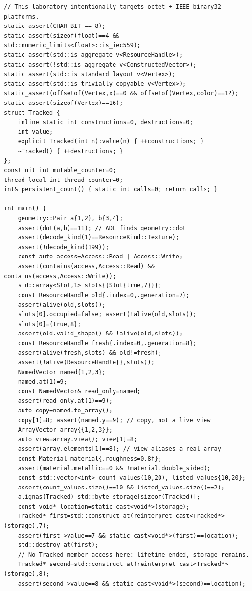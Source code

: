 \begin{verbatim}
// This laboratory intentionally targets octet + IEEE binary32 platforms.
static_assert(CHAR_BIT == 8);
static_assert(sizeof(float)==4 && std::numeric_limits<float>::is_iec559);
static_assert(std::is_aggregate_v<ResourceHandle>);
static_assert(!std::is_aggregate_v<ConstructedVector>);
static_assert(std::is_standard_layout_v<Vertex>);
static_assert(std::is_trivially_copyable_v<Vertex>);
static_assert(offsetof(Vertex,x)==0 && offsetof(Vertex,color)==12);
static_assert(sizeof(Vertex)==16);
struct Tracked {
    inline static int constructions=0, destructions=0;
    int value;
    explicit Tracked(int n):value(n) { ++constructions; }
    ~Tracked() { ++destructions; }
};
constinit int mutable_counter=0;
thread_local int thread_counter=0;
int& persistent_count() { static int calls=0; return calls; }

int main() {
    geometry::Pair a{1,2}, b{3,4};
    assert(dot(a,b)==11); // ADL finds geometry::dot
    assert(decode_kind(1)==ResourceKind::Texture);
    assert(!decode_kind(199));
    const auto access=Access::Read | Access::Write;
    assert(contains(access,Access::Read) && contains(access,Access::Write));
    std::array<Slot,1> slots{{Slot{true,7}}};
    const ResourceHandle old{.index=0,.generation=7};
    assert(alive(old,slots));
    slots[0].occupied=false; assert(!alive(old,slots));
    slots[0]={true,8};
    assert(old.valid_shape() && !alive(old,slots));
    const ResourceHandle fresh{.index=0,.generation=8};
    assert(alive(fresh,slots) && old!=fresh);
    assert(!alive(ResourceHandle{},slots));
    NamedVector named{1,2,3};
    named.at(1)=9;
    const NamedVector& read_only=named;
    assert(read_only.at(1)==9);
    auto copy=named.to_array();
    copy[1]=8; assert(named.y==9); // copy, not a live view
    ArrayVector array{{1,2,3}};
    auto view=array.view(); view[1]=8;
    assert(array.elements[1]==8); // view aliases a real array
    const Material material{.roughness=0.8f};
    assert(material.metallic==0 && !material.double_sided);
    const std::vector<int> count_values(10,20), listed_values{10,20};
    assert(count_values.size()==10 && listed_values.size()==2);
    alignas(Tracked) std::byte storage[sizeof(Tracked)];
    const void* location=static_cast<void*>(storage);
    Tracked* first=std::construct_at(reinterpret_cast<Tracked*>(storage),7);
    assert(first->value==7 && static_cast<void*>(first)==location);
    std::destroy_at(first);
    // No Tracked member access here: lifetime ended, storage remains.
    Tracked* second=std::construct_at(reinterpret_cast<Tracked*>(storage),8);
    assert(second->value==8 && static_cast<void*>(second)==location);

\end{verbatim}
